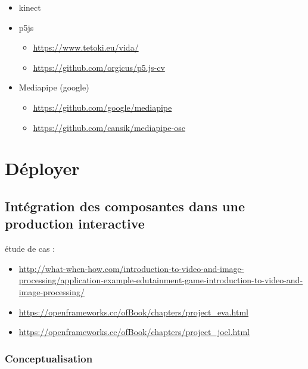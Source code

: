 \documentclass[
  french,
]{book}
\providecommand{\tightlist}{%
  \setlength{\itemsep}{0pt}\setlength{\parskip}{0pt}}
\begin{document}
\begin{itemize}
\item
  kinect
\item
  p5js

  \begin{itemize}
  \tightlist
  \item
    \url{https://www.tetoki.eu/vida/}
  \item
    \url{https://github.com/orgicus/p5.js-cv}
  \end{itemize}
\item
  Mediapipe (google)

  \begin{itemize}
  \tightlist
  \item
    \url{https://github.com/google/mediapipe}
  \item
    \url{https://github.com/cansik/mediapipe-osc}
  \end{itemize}
\end{itemize}

\hypertarget{deployer}{%
\chapter{Déployer}\label{deployer}}

\hypertarget{intuxe9gration-des-composantes-dans-une-production-interactive}{%
\section{Intégration des composantes dans une production interactive}\label{intuxe9gration-des-composantes-dans-une-production-interactive}}

étude de cas :

\begin{itemize}
\item
  \url{http://what-when-how.com/introduction-to-video-and-image-processing/application-example-edutainment-game-introduction-to-video-and-image-processing/}
\item
  \url{https://openframeworks.cc/ofBook/chapters/project_eva.html}
\item
  \url{https://openframeworks.cc/ofBook/chapters/project_joel.html}
\end{itemize}

\hypertarget{conceptualisation}{%
\subsection{Conceptualisation}\label{conceptualisation}}
\end{document}
